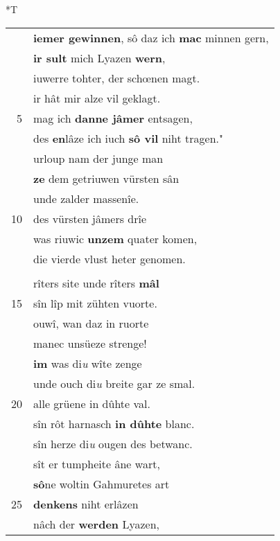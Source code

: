 \documentclass[8pt,a4paper,notitlepage]{article}
\begin{document}
\begin{table}[ht]
\begin{minipage}[t]{0.5\linewidth}
\end{minipage}
\hspace{0.5cm}
\begin{minipage}[t]{0.5\linewidth}
\small
\begin{center}*T
\end{center}
\begin{tabular}{rl}
 & \textbf{iemer gewinnen}, sô daz ich \textbf{mac} minnen gern,\\ 
 & \textbf{ir sult} mich Lyazen \textbf{wern},\\ 
 & iuwerre tohter, der schœnen magt.\\ 
 & ir hât mir alze vil geklagt.\\ 
5 & mag ich \textbf{danne jâmer} entsagen,\\ 
 & des \textbf{en}lâze ich iuch \textbf{sô vil} niht tragen."\\ 
 & urloup nam der junge man\\ 
 & \textbf{ze} dem getriuwen vürsten sân\\ 
 & unde zalder massenîe.\\ 
10 & des vürsten jâmers drîe\\ 
 & was riuwic \textbf{unzem} quater komen,\\ 
 & die vierde vlust heter genomen.\\ 
 & \textbf{\begin{large}V\end{large}on Greharz} schiet \textbf{sus} Parcifal.\\ 
 & rîters site unde rîters \textbf{mâl}\\ 
15 & sîn lîp mit zühten vuorte.\\ 
 & ouwî, wan daz in ruorte\\ 
 & manec unsüeze strenge!\\ 
 & \textbf{im} was di\textit{u} wîte zenge\\ 
 & unde ouch di\textit{u} breite gar ze smal.\\ 
20 & alle grüene in dûhte val.\\ 
 & sîn rôt harnasch \textbf{in dûhte} blanc.\\ 
 & sîn herze di\textit{u} ougen des betwanc.\\ 
 & sît er tumpheite âne wart,\\ 
 & \textbf{sô}ne woltin Gahmuretes art\\ 
25 & \textbf{denkens} niht erlâzen\\ 
 & nâch der \textbf{werden} Lyazen,\\ 

\end{tabular}
\end{minipage}
\end{table}
\end{document}

